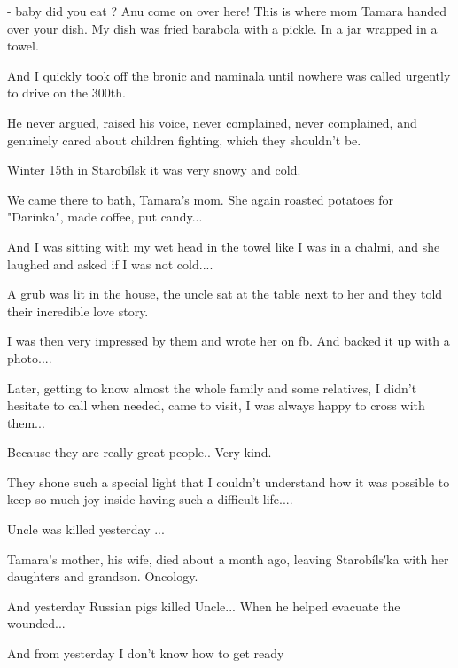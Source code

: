  
 
 
 
 

- baby did you eat ? Anu come on over here! This is where mom Tamara handed
over your dish. My dish was fried barabola with a pickle. In a jar wrapped in a
towel.

And I quickly took off the bronic and naminala until nowhere was called
urgently to drive on the 300th.

He never argued, raised his voice, never complained, never complained, and
genuinely cared about children fighting, which they shouldn't be.

Winter 15th in Starobílsk it was very snowy and cold.

We came there to bath, Tamara's mom. She again roasted potatoes for "Darinka",
made coffee, put candy...

And I was sitting with my wet head in the towel like I was in a chalmi, and she
laughed and asked if I was not cold....

A grub was lit in the house, the uncle sat at the table next to her and they
told their incredible love story.

I was then very impressed by them and wrote her on fb. And backed it up with a
photo....

Later, getting to know almost the whole family and some relatives, I didn't
hesitate to call when needed, came to visit, I was always happy to cross with
them...

Because they are really great people.. Very kind.

They shone such a special light that I couldn't understand how it was possible
to keep so much joy inside having such a difficult life....

Uncle was killed yesterday ...

Tamara's mother, his wife, died about a month ago, leaving Starobílsʹka with
her daughters and grandson. Oncology.

And yesterday Russian pigs killed Uncle... When he helped evacuate the
wounded...

And from yesterday I don't know how to get ready

